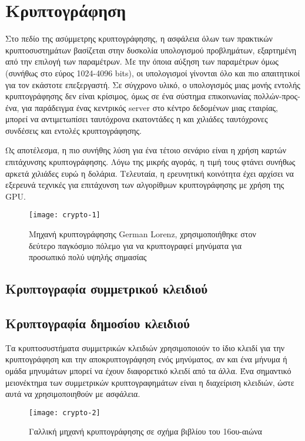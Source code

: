 \section{Κρυπτογράφηση}
Στο πεδίο της ασύμμετρης κρυπτογράφησης, η ασφάλεια όλων των πρακτικών κρυπτοσυστημάτων βασίζεται στην δυσκολία υπολογισμού προβλημάτων, εξαρτημένη από την επιλογή των παραμέτρων. Με την όποια αύξηση των παραμέτρων όμως (συνήθως στο εύρος 1024-4096 bits), οι υπολογισμοί γίνονται όλο και πιο απαιτητικοί για τον εκάστοτε επεξεργαστή. Σε σύγχρονο υλικό, ο υπολογισμός μιας μονής εντολής κρυπτογράφησης δεν είναι κρίσιμος, όμως σε ένα σύστημα επικοινωνίας πολλών-προς-ένα, για παράδειγμα ένας κεντρικός server στο κέντρο δεδομένων μιας εταιρίας, μπορεί να αντιμετωπίσει ταυτόχρονα εκατοντάδες η και χιλιάδες ταυτόχρονες συνδέσεις και εντολές κρυπτογράφησης.

Ως αποτέλεσμα, η πιο συνήθης λύση για ένα τέτοιο σενάριο είναι η χρήση καρτών επιτάχυνσης κρυπτογράφησης. Λόγω της μικρής αγοράς, η τιμή τους φτάνει συνήθως αρκετά χιλιάδες ευρώ η δολάρια.
Τελευταία, η ερευνητική κοινότητα έχει αρχίσει να εξερευνά τεχνικές για επιτάχυνση των αλγορίθμων κρυπτογράφησης με χρήση της GPU.  

\begin{figure}[h]
\centering
\texttt{[image: crypto-1]}
\caption{Μηχανή κρυπτογράφησης German Lorenz, χρησιμοποιήθηκε στον δεύτερο παγκόσμιο πόλεμο για να κρυπτογραφεί μηνύματα για προσωπικό πολύ υψηλής σημασίας}
\end{figure}

\subsection{Κρυπτογραφία συμμετρικού κλειδιού}

\subsection{Κρυπτογραφία δημοσίου κλειδιού}
Τα κρυπτοσυστήματα συμμετρικών κλειδιών χρησιμοποιούν το ίδιο κλειδί για την κρυπτογράφηση και την αποκρυπτογράφηση ενός μηνύματος, αν και ένα μήνυμα ή ομάδα μηνυμάτων μπορεί να έχουν διαφορετικό κλειδί από τα άλλα. Ένα σημαντικό μειονέκτημα των συμμετρικών κρυπτογραφημάτων είναι η διαχείριση κλειδιών, ώστε αυτά να χρησιμοποιηθούν με ασφάλεια. 

\begin{figure}[h]
\centering
\texttt{[image: crypto-2]}
\caption{Γαλλική μηχανή κρυπτογράφησης σε σχήμα βιβλίου του 16ου-αιώνα}
\end{figure}

